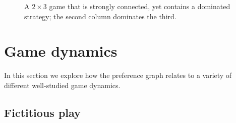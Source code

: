 \documentclass[preprint,authoryear]{elsarticle}
\begin{document}
\begin{figure}
    \centering
    
    \caption{A $2\times 3$ game that is strongly connected, yet contains a dominated strategy; the second column dominates the third.}
    \label{fig:connected dominance}
\end{figure}






\section{Game dynamics} \label{sec: dynamics}

In this section we explore how the preference graph relates to a variety of different well-studied game dynamics.

\subsection{Fictitious play} \label{sec: FP}

\end{document}
